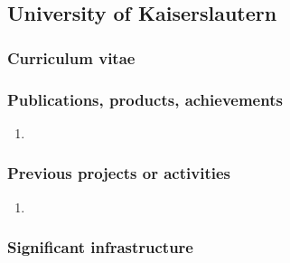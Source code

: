 \subsection*{University of Kaiserslautern}


\subsubsection*{Curriculum vitae}



\subsubsection*{Publications, products, achievements}

\begin{enumerate}
\item {}
\end{enumerate}

\subsubsection*{Previous projects or activities}

\begin{enumerate}
\item {}
\end{enumerate}

\subsubsection*{Significant infrastructure}

